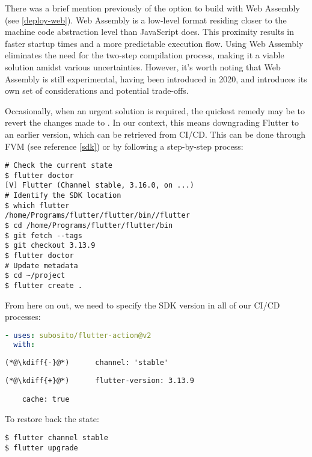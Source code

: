 There was a brief mention previously of the option to build with Web Assembly (see \ref{deploy-web}). Web Assembly is a 
low-level format residing closer to the machine code abstraction level than JavaScript does. This proximity results in 
faster startup times and a more predictable execution flow. Using Web Assembly eliminates the need for the two-step 
compilation process, making it a viable solution amidst various uncertainties. However, it's worth noting that Web 
Assembly is still experimental, having been introduced in 2020, and introduces its own set of considerations and 
potential trade-offs.

Occasionally, when an urgent solution is required, the quickest remedy may be to revert the changes made to . In our context, this means downgrading Flutter to an earlier version, which can be retrieved from CI/CD. This can be done through FVM (see reference \ref{sdk}) or by following a step-by-step process:

\begin{lstlisting}[language=terminal]
# Check the current state
$ flutter doctor
[V] Flutter (Channel stable, 3.16.0, on ...)
# Identify the SDK location
$ which flutter
/home/Programs/flutter/flutter/bin//flutter
$ cd /home/Programs/flutter/flutter/bin
$ git fetch --tags
$ git checkout 3.13.9
$ flutter doctor
# Update metadata
$ cd ~/project
$ flutter create .
\end{lstlisting}

\noindent From here on out, we need to specify the SDK version in all of our CI/CD processes:

\begin{lstlisting}[language=yaml]
- uses: subosito/flutter-action@v2
  with:
\end{lstlisting}
{
\xpretocmd{\lstlisting}{\vspace{-12pt}}{}{}
\begin{lstlisting}[firstnumber=2, backgroundcolor=\color{backred}]
(*@\kdiff{-}@*)      channel: 'stable'
\end{lstlisting}
\begin{lstlisting}[firstnumber=2, backgroundcolor=\color{backgreen}]
(*@\kdiff{+}@*)      flutter-version: 3.13.9
\end{lstlisting}
\begin{lstlisting}
    cache: true
\end{lstlisting}
}

\noindent To restore back the state:

\begin{lstlisting}[language=terminal]
$ flutter channel stable
$ flutter upgrade
\end{lstlisting}

